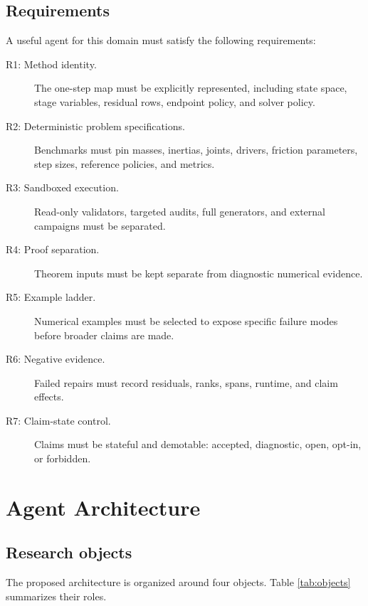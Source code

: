 \documentclass[10pt]{article}
\begin{document}
\subsection{Requirements}

A useful agent for this domain must satisfy the following requirements:
\begin{description}
  \item[R1: Method identity.] The one-step map must be explicitly represented,
  including state space, stage variables, residual rows, endpoint policy, and
  solver policy.
  \item[R2: Deterministic problem specifications.] Benchmarks must pin masses,
  inertias, joints, drivers, friction parameters, step sizes, reference
  policies, and metrics.
  \item[R3: Sandboxed execution.] Read-only validators, targeted audits,
  full generators, and external campaigns must be separated.
  \item[R4: Proof separation.] Theorem inputs must be kept separate from
  diagnostic numerical evidence.
  \item[R5: Example ladder.] Numerical examples must be selected to expose
  specific failure modes before broader claims are made.
  \item[R6: Negative evidence.] Failed repairs must record residuals, ranks,
  spans, runtime, and claim effects.
  \item[R7: Claim-state control.] Claims must be stateful and demotable:
  accepted, diagnostic, open, opt-in, or forbidden.
\end{description}

\section{Agent Architecture}

\subsection{Research objects}

The proposed architecture is organized around four objects. Table
\ref{tab:objects} summarizes their roles.
\end{document}
